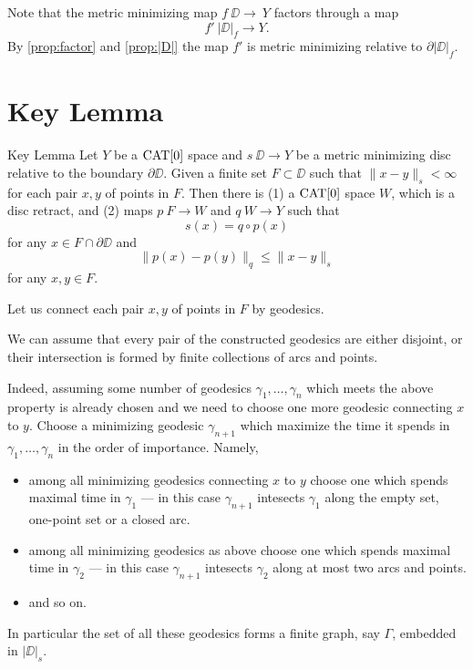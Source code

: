 \documentclass[a4paper,10pt]{amsart}
\begin{document}
Note that the metric minimizing map $f\:\DD\to\ Y$ factors through a map \[f'\:|\DD|_f\to Y.\]
By \ref{prop:factor} and \ref{prop:|D|} 
the map $f'$
is metric minimizing relative to $\partial|\DD|_f$.

\section{Key Lemma}


\begin{thm}{Key Lemma}\label{lem:key}
Let $Y$ be a $\mathop{\rm CAT}\nolimits[0]$ space and $s\:\DD\to Y$ 
be a metric minimizing disc relative to the boundary $\partial \DD$.
Given a finite set $F\subset \DD$ such that $\|x-y\|_s<\infty$ for each pair $x,y$ of points in $F$. Then
there is 
(1) a $\mathop{\rm CAT}\nolimits[0]$ space $W$, which is a disc retract,
and (2) maps $p\:F\to W$ and $q\:W\to Y$ such that
\[s(x)=q\circ p(x)\] 
for any $x\in F\cap \partial \DD$
and 
\[\|p(x)-p(y)\|_q\le \|x-y\|_s\] 
for any $x,y\in F$.
\end{thm}

Let us connect each pair $x,y$ of points in $F$ by geodesics.

We can assume that 
every pair of the constructed geodesics 
are either disjoint, or their intersection is formed by finite collections of arcs and points.

Indeed, assuming some number of geodesics $\gamma_1,\dots,\gamma_n$ which meets the above property is already chosen and we need to choose one more geodesic connecting $x$ to $y$.
Choose a minimizing geodesic $\gamma_{n+1}$ which maximize the time it spends in $\gamma_1,\dots,\gamma_n$  in the order of importance.
Namely, 
\begin{itemize}
\item  among all minimizing geodesics connecting $x$ to $y$
choose one which spends maximal time in $\gamma_1$ --- in this case $\gamma_{n+1}$ intesects $\gamma_1$ along the empty set, one-point set or a closed arc.
\item among all minimizing geodesics as above
choose one which spends maximal time in $\gamma_2$ --- in this case $\gamma_{n+1}$ intesects $\gamma_2$ along at most two arcs and points.
\item and so on.
\end{itemize}


In particular the set of all these geodesics forms a finite graph, say $\Gamma$,
embedded in $|\DD|_s$. 
\end{document}

